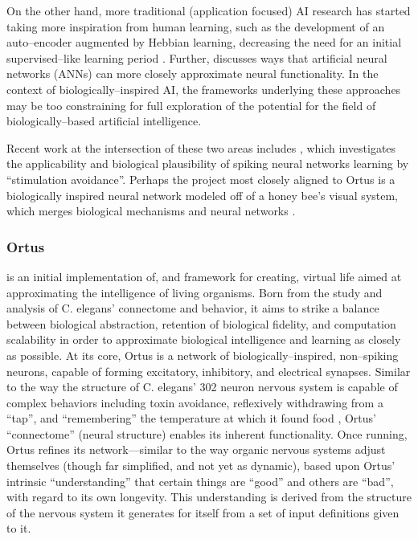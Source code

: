 \documentclass[letterpaper]{article}
\begin{document}
On the other hand, more traditional (application focused) AI research has started taking more inspiration from human learning, such as the development of an auto--encoder augmented by Hebbian learning, decreasing the need for an initial supervised--like learning period \citep{Bowren2016}. Further, \citet{Marblestone2016} discusses ways that artificial neural networks (ANNs) can more closely approximate neural functionality.
In the context of biologically--inspired AI, the frameworks underlying these approaches may be too constraining for full exploration of the potential for the field of biologically--based artificial intelligence. 

Recent work at the intersection of these two areas includes \citet{Sinapayen2016}, which investigates the applicability and biological plausibility of spiking neural networks learning by ``stimulation avoidance''. Perhaps the project most closely aligned to Ortus is a biologically inspired neural network modeled off of a honey bee's visual system, which merges biological mechanisms and neural networks \citep{Roper2017}.


\subsubsection{Ortus} is an initial implementation of, and framework for creating, virtual life aimed at approximating the intelligence of living organisms.
Born from the study and analysis of C. elegans' connectome and behavior, it aims to strike a balance between biological abstraction, retention of biological fidelity, and computation scalability in order to approximate biological intelligence and learning as closely as possible.
At its core, Ortus is a network of biologically--inspired, non--spiking neurons, capable of forming excitatory, inhibitory, and electrical synapses.
Similar to the way the structure of C. elegans' 302 neuron nervous system is capable of complex behaviors including toxin avoidance, reflexively withdrawing from a ``tap'', and ``remembering'' the temperature at which it found food \citep{Jarrell2012}, Ortus' ``connectome'' (neural structure) enables its inherent functionality.
Once running, Ortus refines its network---similar to the way organic nervous systems adjust themselves (though far simplified, and not yet as dynamic), based upon Ortus' intrinsic ``understanding'' that certain things are ``good'' and others are ``bad'', with regard to its own longevity.
This understanding is derived from the structure of the nervous system it generates for itself from a set of input definitions given to it.
\end{document}
